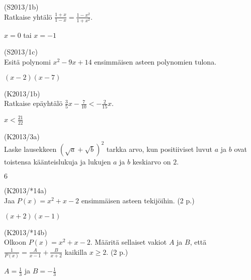 \begin{tehtava}
(S2013/1b) \\ Ratkaise yhtälö $\frac{1+x}{1-x}=\frac{1-x^2}{1+x^2}$.
\begin{vastaus}
$x=0$ tai $x=-1$
\end{vastaus}
\end{tehtava}

\begin{tehtava}
(S2013/1c) \\ Esitä polynomi $x^2-9x+14$ ensimmäisen asteen polynomien tulona.
\begin{vastaus}
$(x-2)(x-7)$
\end{vastaus}
\end{tehtava}

\begin{tehtava}
(K2013/1b) \\ Ratkaise epäyhtälö $\frac{3}{5}x-\frac{7}{10} < -\frac{2}{15}x$.
\begin{vastaus}
$x<\frac{21}{22}$
\end{vastaus}
\end{tehtava}

\begin{tehtava}
(K2013/3a) \\ Laske lausekkeen $(\sqrt{a}+\sqrt{b})^2$ tarkka arvo, kun positiiviset luvut $a$ ja $b$ ovat toistensa käänteislukuja ja lukujen $a$ ja $b$ keskiarvo on $2$.
\begin{vastaus}
$6$
\end{vastaus}
\end{tehtava}

\begin{tehtava}
(K2013/*14a) \\ Jaa $P(x)=x^2+x-2$ ensimmäisen asteen tekijöihin. (2 p.)
\begin{vastaus}
$(x+2)(x-1)$
\end{vastaus}
\end{tehtava}

\begin{tehtava}
(K2013/*14b) \\ Olkoon $P(x)=x^2+x-2$. Määritä sellaiset vakiot $A$ ja $B$, että $\frac{1}{P(x)}=\frac{A}{x-1}+\frac{B}{x+2} $ kaikilla $x \geq 2$. (2 p.)
\begin{vastaus}
$A= \frac{1}{3}$ ja $B=- \frac{1}{3}$
\end{vastaus}
\end{tehtava}



  

